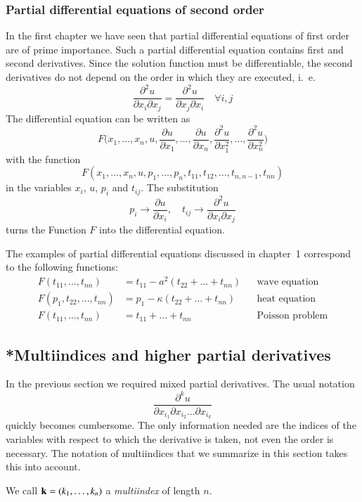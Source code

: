 \subsubsection{Partial differential equations of second order}
In the first chapter we have seen that partial differential equations of
first order are of prime importance.
Such a partial differential equation contains first and second derivatives.
Since the solution function must be differentiable, the second derivatives
do not depend on the order in which they are executed, i.~e.
\[
\frac{\partial^2 u}{\partial x_i\partial x_j}
=
\frac{\partial^2 u}{\partial x_j\partial x_i}
\quad\forall i,j
\]
The differential equation can be written as
\[
F\biggl(x_1,\dots,x_n,u,
\frac{\partial u}{\partial x_1},\dots,\frac{\partial u}{\partial x_n},
\frac{\partial^2 u}{\partial x_1^2},\dots,\frac{\partial^2 u}{\partial x_n^2}\biggr)
\]
with the function
\[
F(x_1,\dots,x_n,u,p_1,\dots,p_n,t_{11},t_{12},\dots,t_{n,n-1},t_{nn})
\]
in the variables $x_i$, $u$, $p_i$ and $t_{ij}$.
The substitution
\[
p_i\to \frac{\partial u}{\partial x_i}
,\quad
t_{ij}\to \frac{\partial^2 u}{\partial x_i\partial x_j}
\]
turns the Function $F$ into the differential equation.

The examples of partial differential equations discussed in chapter~1
correspond to the following functions:
\begin{align*}
F(t_{11},\dots,t_{nn})&=t_{11}-a^2(t_{22}+\dots+t_{nn})&&\text{wave equation}
\\
F(p_1,t_{22},\dots,t_{nn})&=p_1-\kappa(t_{22}+\dots+t_{nn})&&\text{heat equation}
\\
F(t_{11},\dots,t_{nn})&=t_{11}+\dots+t_{nn}&&\text{Poisson problem}
\end{align*}

\subsection{*Multiindices and higher partial derivatives
\label{klassifikation:multiindizes}}
In the previous section we required mixed partial derivatives.
The usual notation
\[
\frac{\partial^k u}{\partial x_{i_1}\partial x_{i_2}\dots\partial x_{i_k}}
\]
quickly becomes cumbersome.
The only information needed are the indices of the variables with respect
to which the derivative is taken, not even the order is necessary.
The notation of multiindices that we summarize in this section takes
this into account.
\begin{definition}
We call
${\bf k}=(k_1,\dots,k_n)$ a {\em multiindex} of length $n$.
\end{definition}

